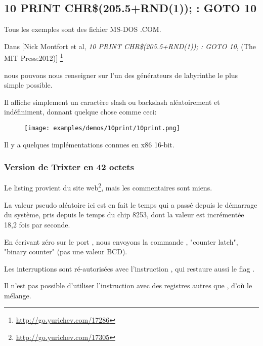 \subsection{10 PRINT CHR\$(205.5+RND(1)); : GOTO 10}

Tous les exemples sont des fichier MS-DOS .COM.

Dans [Nick Montfort et al, \emph{10 PRINT CHR\$(205.5+RND(1)); : GOTO 10}, (The MIT Press:2012)]
\footnote{\AlsoAvailableAs \url{http://go.yurichev.com/17286}}

nous pouvons nous renseigner sur l'un des générateurs de labyrinthe le plus simple
possible.

Il affiche simplement un caractère slash ou backslash aléatoirement et indéfiniment,
donnant quelque chose comme ceci:

\begin{figure}[H]
\centering
\texttt{[image: examples/demos/10print/10print.png]}
\end{figure}

Il y a quelques implémentations connues en x86 16-bit.

\subsubsection{Version de Trixter en 42 octets}

\newcommand{\FNURLTRIXTER}{\footnote{\url{http://go.yurichev.com/17305}}}

Le listing provient du site web\FNURLTRIXTER, mais les commentaires sont miens.



La valeur pseudo aléatoire ici est en fait le temps qui a passé depuis le démarrage
du système, pris depuis le temps du chip 8253, dont la valeur est incrémentée 18,2
fois par seconde.

En écrivant zéro sur le port ,
nous envoyons la commande ,
"counter latch", 
"binary counter" (pas une valeur \ac{BCD}).

Les interruptions sont ré-autorisées avec l'instruction , qui restaure aussi
le flag .

Il n'est pas possible d'utiliser l'instruction  avec des registres autres
que , d'où le mélange.

